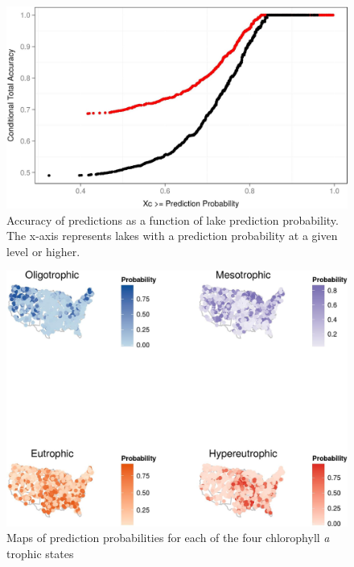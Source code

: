\documentclass[11pt,]{article}
\begin{document}
\newpage

\begin{figure}[htbp]
\centering
\includegraphics{manuscript_files/figure-latex/cond_prob_fig-1.jpeg}
\caption{Accuracy of predictions as a function of lake prediction
probability. The x-axis represents lakes with a prediction probability
at a given level or higher. \label{fig:cond_prob_fig}}
\end{figure}

\newpage

\begin{figure}[htbp]
\centering
\includegraphics{manuscript_files/figure-latex/gis_probability_map-1.jpeg}
\caption{Maps of prediction probabilities for each of the four
chlorophyll \textit{a} trophic states \label{fig:gis_probability_map}}
\end{figure}

\newpage
\end{document}
